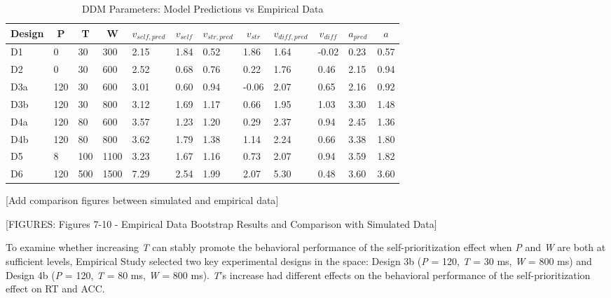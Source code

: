 \documentclass[
  english,
  man,floatsintext]{apa6}
\begin{document}
\begin{table}[tbp]

\begin{center}
\begin{threeparttable}

\caption{\label{tab:tbl-ddm-parameters}DDM Parameters: Model Predictions vs Empirical Data}

\begin{tabular}{llllllllllll}
\toprule
Design & \multicolumn{1}{c}{P} & \multicolumn{1}{c}{T} & \multicolumn{1}{c}{W} & \multicolumn{1}{c}{$v_{self,pred}$} & \multicolumn{1}{c}{$v_{self}$} & \multicolumn{1}{c}{$v_{str,pred}$} & \multicolumn{1}{c}{$v_{str}$} & \multicolumn{1}{c}{$v_{diff,pred}$} & \multicolumn{1}{c}{$v_{diff}$} & \multicolumn{1}{c}{$a_{pred}$} & \multicolumn{1}{c}{$a$}\\
\midrule
D1 & 0 & 30 & 300 & 2.15 & 1.84 & 0.52 & 1.86 & 1.64 & -0.02 & 0.23 & 0.57\\
D2 & 0 & 30 & 600 & 2.52 & 0.68 & 0.76 & 0.22 & 1.76 & 0.46 & 2.15 & 0.94\\
D3a & 120 & 30 & 600 & 3.01 & 0.60 & 0.94 & -0.06 & 2.07 & 0.65 & 2.16 & 0.92\\
D3b & 120 & 30 & 800 & 3.12 & 1.69 & 1.17 & 0.66 & 1.95 & 1.03 & 3.30 & 1.48\\
D4a & 120 & 80 & 600 & 3.57 & 1.23 & 1.20 & 0.29 & 2.37 & 0.94 & 2.45 & 1.36\\
D4b & 120 & 80 & 800 & 3.62 & 1.79 & 1.38 & 1.14 & 2.24 & 0.66 & 3.38 & 1.80\\
D5 & 8 & 100 & 1100 & 3.23 & 1.67 & 1.16 & 0.73 & 2.07 & 0.94 & 3.59 & 1.82\\
D6 & 120 & 500 & 1500 & 7.29 & 2.54 & 1.99 & 2.07 & 5.30 & 0.48 & 3.60 & 3.60\\
\bottomrule
\end{tabular}

\end{threeparttable}
\end{center}

\end{table}

{[}Add comparison figures between simulated and empirical data{]}

{[}FIGURES: Figures 7-10 - Empirical Data Bootstrap Results and Comparison with Simulated Data{]}

To examine whether increasing \emph{T} can stably promote the behavioral performance of the self-prioritization effect when \emph{P} and \emph{W} are both at sufficient levels, Empirical Study selected two key experimental designs in the space: Design 3b (\emph{P} = 120, \emph{T} = 30 ms, \emph{W} = 800 ms) and Design 4b (\emph{P} = 120, \emph{T} = 80 ms, \emph{W} = 800 ms). \emph{T}'s increase had different effects on the behavioral performance of the self-prioritization effect on RT and ACC.
\end{document}
